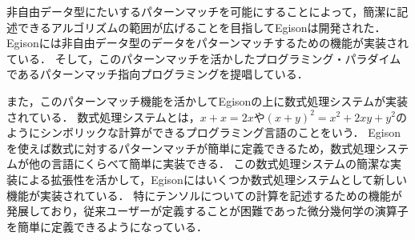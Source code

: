 非自由データ型にたいするパターンマッチを可能にすることによって，簡潔に記述できるアルゴリズムの範囲が広げることを目指してEgisonは開発された．
Egisonには非自由データ型のデータをパターンマッチするための機能が実装されている．
そして，このパターンマッチを活かしたプログラミング・パラダイムであるパターンマッチ指向プログラミングを提唱している．

また，このパターンマッチ機能を活かしてEgisonの上に数式処理システムが実装されている．
数式処理システムとは，$x + x = 2 x$や$(x + y)^2 = x^2 + 2 x y + y^2$のようにシンボリックな計算ができるプログラミング言語のことをいう．
Egisonを使えば数式に対するパターンマッチが簡単に定義できるため，数式処理システムが他の言語にくらべて簡単に実装できる．
この数式処理システムの簡潔な実装による拡張性を活かして，Egisonにはいくつか数式処理システムとして新しい機能が実装されている．
特にテンソルについての計算を記述するための機能が発展しており，従来ユーザーが定義することが困難であった微分幾何学の演算子を簡単に定義できるようになっている．

